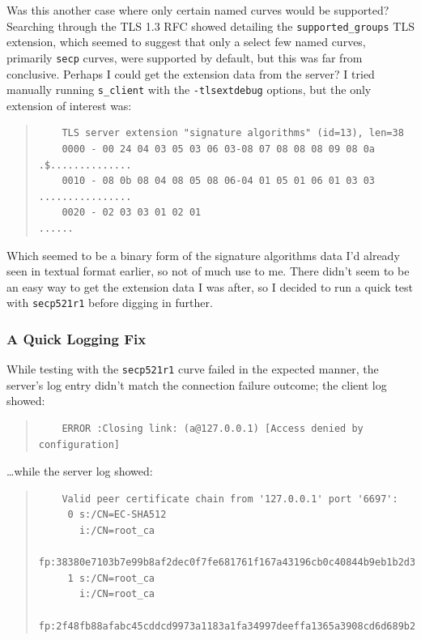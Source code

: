 \documentclass{article}
\begin{document}
Was this another case where only certain named curves would be supported?  Searching through the TLS 1.3 RFC showed  detailing the \texttt{supported_groups} TLS extension, which seemed to suggest that only a select few named curves, primarily \texttt{secp} curves, were supported by default, but this was far from conclusive.  Perhaps I could get the extension data from the server?  I tried manually running \texttt{s_client} with the \texttt{-tlsextdebug} options, but the only extension of interest was:

\begin{quote}
\begin{verbatim}
	TLS server extension "signature algorithms" (id=13), len=38
	0000 - 00 24 04 03 05 03 06 03-08 07 08 08 08 09 08 0a   .$..............
	0010 - 08 0b 08 04 08 05 08 06-04 01 05 01 06 01 03 03   ................
	0020 - 02 03 03 01 02 01                                 ......
\end{verbatim}
\end{quote}

Which seemed to be a binary form of the signature algorithms data I'd already seen in textual format earlier, so not of much use to me.  There didn't seem to be an easy way to get the extension data I was after, so I decided to run a quick test with \texttt{secp521r1} before digging in further.

\subsubsection{A Quick Logging Fix}
While testing with the \texttt{secp521r1} curve failed in the expected manner, the server's log entry didn't match the connection failure outcome; the client log showed:

\begin{quote}
\begin{verbatim}
	ERROR :Closing link: (a@127.0.0.1) [Access denied by configuration]
\end{verbatim}
\end{quote}

\ldots while the server log showed:

\begin{quote}
\begin{verbatim}
	Valid peer certificate chain from '127.0.0.1' port '6697':
	 0 s:/CN=EC-SHA512
	   i:/CN=root_ca
	   fp:38380e7103b7e99b8af2dec0f7fe681761f167a43196cb0c40844b9eb1b2d3cf
	 1 s:/CN=root_ca
	   i:/CN=root_ca
	   fp:2f48fb88afabc45cddcd9973a1183a1fa34997deeffa1365a3908cd6d689b2cb
\end{verbatim}
\end{quote}
\end{document}

